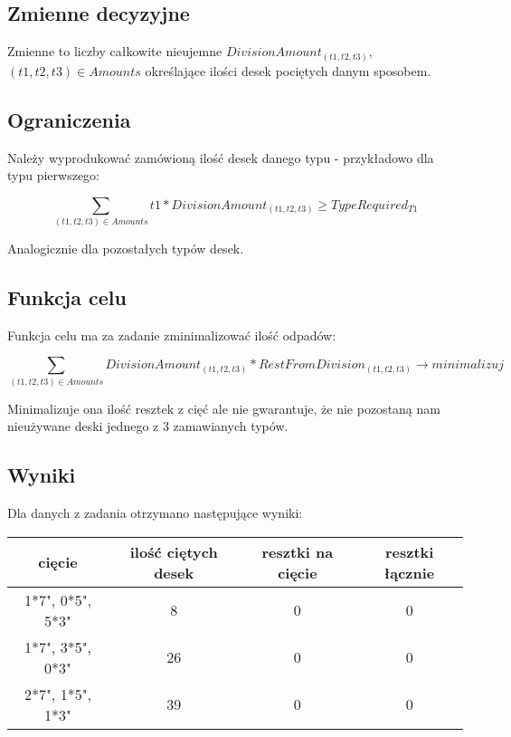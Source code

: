 \documentclass[polish,12pt,titlepage]{article}
\begin{document}
\subsection{Zmienne decyzyjne}

Zmienne to liczby całkowite nieujemne $DivisionAmount_{(t1,t2,t3)}$, $(t1,t2,t3) \in Amounts$ określające ilości desek pociętych danym sposobem.

\subsection{Ograniczenia}

Należy wyprodukować zamówioną ilość desek danego typu - przykładowo dla typu pierwszego:

\begin{center}
$$\sum\limits_{(t1,t2,t3) \in Amounts} t1 * DivisionAmount_{(t1,t2,t3)} \ge TypeRequired_{T1}$$
\end{center}

Analogicznie dla pozostałych typów desek.

\subsection{Funkcja celu}

Funkcja celu ma za zadanie zminimalizować ilość odpadów:

\begin{center}
$$\sum\limits_{(t1,t2,t3) \in Amounts} DivisionAmount_{(t1,t2,t3)} * RestFromDivision_{(t1,t2,t3)} \longrightarrow minimalizuj$$
\end{center}

Minimalizuje ona ilość resztek z cięć ale nie gwarantuje, że nie pozostaną nam nieużywane deski jednego z 3 zamawianych typów.

\subsection{Wyniki}

Dla danych z zadania otrzymano następujące wyniki:

\begin{tabular}{ | c | c | c | c | }
	\hline
	cięcie & ilość ciętych desek & resztki na cięcie & resztki łącznie \\
	\hline
	1*7", 0*5", 5*3" & 8  & 0 & 0 \\
	1*7", 3*5", 0*3" & 26 & 0 & 0 \\
	2*7", 1*5", 1*3" & 39 & 0 & 0 \\
	\hline
\end{tabular}
\end{document}
